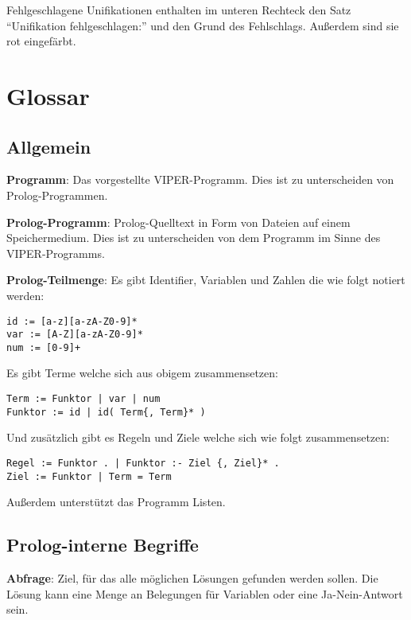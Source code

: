 \documentclass[parskip=full,11pt,twoside]{scrartcl}
\begin{document}
\begin{minipage}{\linewidth}
\end{minipage}

Fehlgeschlagene Unifikationen enthalten im unteren Rechteck den Satz \enquote{Unifikation fehlgeschlagen:} und den Grund des Fehlschlags.
Außerdem sind sie rot eingefärbt.

\section{Glossar}

\subsection{Allgemein}

\textbf{Programm}:
Das vorgestellte VIPER-Programm. Dies ist zu unterscheiden von Prolog-Programmen.

\textbf{Prolog-Programm}:
Prolog-Quelltext in Form von Dateien auf einem Speichermedium. Dies ist zu unterscheiden von dem Programm im Sinne des VIPER-Programms.

\textbf{Prolog-Teilmenge}:
Es gibt Identifier, Variablen und Zahlen die wie folgt notiert werden:

\begin{lstlisting}
id := [a-z][a-zA-Z0-9]*
var := [A-Z][a-zA-Z0-9]*
num := [0-9]+
\end{lstlisting}

Es gibt Terme welche sich aus obigem zusammensetzen:

\begin{lstlisting}
Term := Funktor | var | num
Funktor := id | id( Term{, Term}* )
\end{lstlisting}

Und zusätzlich gibt es Regeln und Ziele welche sich wie folgt zusammensetzen:

\begin{lstlisting}
Regel := Funktor . | Funktor :- Ziel {, Ziel}* .
Ziel := Funktor | Term = Term
\end{lstlisting}

Außerdem unterstützt das Programm Listen.

\subsection{Prolog-interne Begriffe}
\textbf{Abfrage}:
Ziel, für das alle möglichen Lösungen gefunden werden sollen. Die Lösung kann eine Menge an Belegungen für Variablen oder eine Ja-Nein-Antwort sein.
\end{document}
